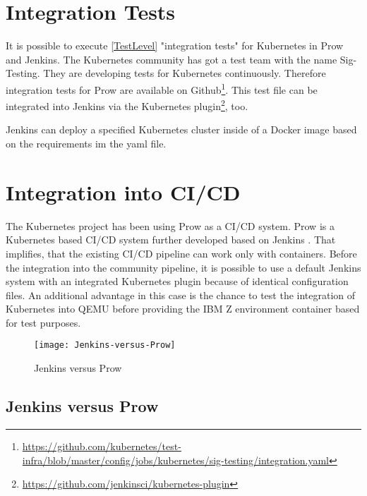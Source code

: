 \section{Integration Tests} \label{Kub-IntegrationTest}

It is possible to execute \ref{TestLevel} "integration tests" for Kubernetes in Prow and Jenkins.
The Kubernetes community has got a test team with the name Sig-Testing. They are developing tests for Kubernetes continuously. Therefore integration tests for Prow are available on Github\footnote{\url{https://github.com/kubernetes/test-infra/blob/master/config/jobs/kubernetes/sig-testing/integration.yaml}}. This test file can be integrated into Jenkins via the Kubernetes plugin\footnote{\url{https://github.com/jenkinsci/kubernetes-plugin}}, too.

Jenkins can deploy a specified Kubernetes cluster inside of a Docker image based on the requirements im the yaml file.

\section{Integration into \gls{CI/CD}}

The Kubernetes project has been using Prow as a \gls{CI/CD} system. Prow is a Kubernetes based \gls{CI/CD} system further developed based on Jenkins \cite{JAXenter}. That implifies, that the existing \gls{CI/CD} pipeline can work only with containers.
Before the integration into the community pipeline, it is possible to use a default Jenkins system with an integrated Kubernetes plugin because of identical configuration files. An additional advantage in this case is the chance to test the integration of Kubernetes into \gls{QEMU} before providing the IBM Z environment container based for test purposes.

\begin{figure}[H]
\centering
\texttt{[image: Jenkins-versus-Prow]}
 \caption{Jenkins versus Prow}
    \label{JenkinsProw}
\end{figure}


\subsection{Jenkins versus Prow}


